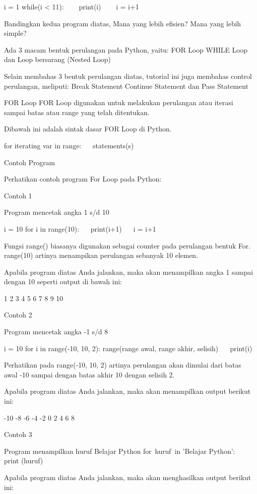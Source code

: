  

i = 1 
while(i < 11): 
~~~ print(i) 
~~~ i = i+1 

Bandingkan kedua program diatas, Mana yang lebih efisien? Mana yang lebih simple?

Ada 3 macam bentuk perulangan pada Python, yaitu: 
FOR Loop 
WHILE Loop 
dan Loop bersarang (Nested Loop) 

Selain membahas 3 bentuk perulangan diatas, tutorial ini juga membahas control perulangan, meliputi: 
Break Statement 
Continue Statement 
dan Pass Statement 


FOR Loop 
FOR Loop digunakan untuk melakukan perulangan atau iterasi sampai batas atau range yang telah ditentukan.

Dibawah ini adalah sintak dasar FOR Loop di Python.

 
for iterating     var in range: 
~~ statements(s) 

Contoh Program

Perhatikan contoh program For Loop pada Python:

Contoh 1

 
Program mencetak angka 1 s/d 10 

i = 10 
for i in range(10): 
~~ print(i+1) 
~~ i = i+1 

Fungsi   range()   biasanya digunakan sebagai counter pada perulangan bentuk For. range(10) artinya menampikan perulangan sebanyak 10 elemen.

Apabila program diatas Anda jalankan, maka akan menampilkan angka 1 sampai dengan 10 seperti output di bawah ini:

 
1 
2 
3 
4 
5 
6 
7 
8 
9 
10 

Contoh 2

 
 Program mencetak angka -1 s/d 8 

i = 10 
for i in range(-10, 10, 2):       range(range awal, range akhir, selisih) 
~~ print(i) 


Perhatikan pada range(-10, 10, 2) artinya perulangan akan dimulai dari batas awal -10 sampai dengan batas akhir 10 dengan selisih 2.

Apabila program diatas Anda jalankan, maka akan menampilkan output berikut ini:

 
-10 
-8 
-6 
-4 
-2 
0 
2 
4 
6 
8 

Contoh 3

 
Program menampilkan huruf Belajar Python 
for~huruf~in 'Belajar Python':    
~~ print (huruf) 

Apabila program diatas Anda jalankan, maka akan menghasilkan output berikut ini:

